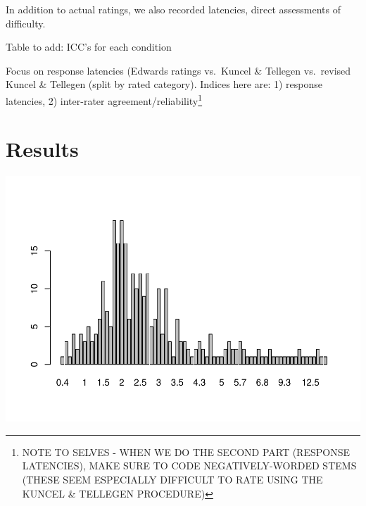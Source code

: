 \documentclass[
  english,
  ,jou]{apa6}
\begin{document}
In addition to actual ratings, we also recorded latencies, direct assessments of difficulty.

Table to add: ICC's for each condition

Focus on response latencies (Edwards ratings vs.~Kuncel \& Tellegen vs.~revised Kuncel \& Tellegen (split by rated category). Indices here are: 1) response latencies, 2) inter-rater agreement/reliability\footnote{NOTE TO SELVES - WHEN WE DO THE SECOND PART (RESPONSE LATENCIES), MAKE SURE TO CODE NEGATIVELY-WORDED STEMS (THESE SEEM ESPECIALLY DIFFICULT TO RATE USING THE KUNCEL \& TELLEGEN PROCEDURE)}

\hypertarget{results}{%
\section{Results}\label{results}}

\includegraphics{KuncelTellegen2_files/figure-latex/getQualtrics-1.pdf}
\end{document}
